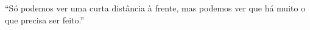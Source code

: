 ``Só podemos ver uma curta distância à frente, mas podemos ver que há muito o que precisa ser feito.''



